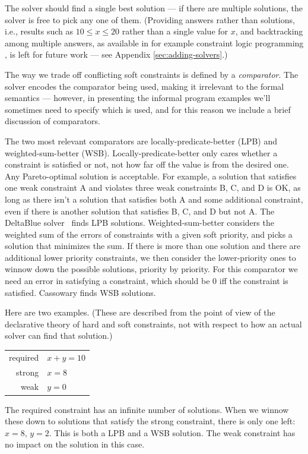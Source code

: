 \documentclass{article}
\begin{document}
The solver should find a single best solution --- if there are
multiple solutions, the solver is free to pick any one of them.
(Providing answers rather than solutions, i.e., results such as $10
\leq x \leq 20$ rather than a single value for $x$, and backtracking
among multiple answers, as available in for example constraint logic
programming \cite{jaffar-popl-1987}, is left for future work ---
see Appendix \ref{sec:adding-solvers}.)

The way we trade off conflicting soft constraints is defined by a
\emph{comparator}.  The solver encodes the comparator being used,
making it irrelevant to the formal semantics --- however, in
presenting the informal program examples we'll sometimes need to
specify which is used, and for this reason we include a brief
discussion of comparators.

The two most relevant comparators are
locally-predicate-better (LPB) and weighted-sum-better (WSB)\@.
Locally-predicate-better only cares whether a constraint is satisfied
or not, not how far off the value is from the desired one.  Any
Pareto-optimal solution is acceptable.  For example, a solution that
satisfies one weak constraint A and violates three weak constraints B,
C, and D is OK, as long as there isn't a solution that satisfies both
A and some additional constraint, even if there is another solution
that satisfies B, C, and D but not A\@.  The DeltaBlue
solver~\cite{freeman-benson-cacm-1990} finds LPB solutions.
Weighted-sum-better considers the weighted sum of the errors of
constraints with a given soft priority, and picks a solution that
minimizes the sum.  If there is more than one solution and there are
additional lower priority constraints, we then consider the
lower-priority ones to winnow down the possible solutions, priority by
priority.  For this comparator we need an error in satisfying a
constraint, which should be 0 iff the constraint is satisfied.
Cassowary \cite{badros-tochi-2001} finds WSB solutions.

Here are two examples.  (These are described from the point of view of
the declarative theory of hard and soft constraints, not with respect
to how an actual solver can find that solution.)

\begin{tabular}{rl}
required & $x+y=10$ \\
strong   & $x=8$ \\
weak     & $y=0$
\end{tabular}

The required constraint has an infinite number of solutions.  When we
winnow these down to solutions that satisfy the strong constraint,
there is only one left: $x=8$, $y=2$.  This is both a LPB and a WSB
solution.  The weak constraint has no impact on the solution in this
case.
\end{document}
